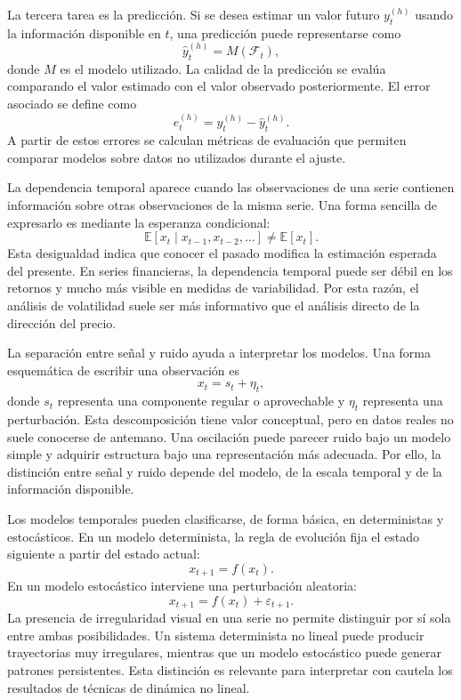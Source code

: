 La tercera tarea es la predicción. Si se desea estimar un valor futuro \(y_t^{(h)}\) usando la información disponible en \(t\), una predicción puede representarse como
\begin{equation}
    \hat{y}_t^{(h)} = M(\mathcal{F}_t),
\end{equation}
donde \(M\) es el modelo utilizado. La calidad de la predicción se evalúa comparando el valor estimado con el valor observado posteriormente. El error asociado se define como
\begin{equation}
    e_t^{(h)} = y_t^{(h)} - \hat{y}_t^{(h)}.
\end{equation}
A partir de estos errores se calculan métricas de evaluación que permiten comparar modelos sobre datos no utilizados durante el ajuste.

La dependencia temporal aparece cuando las observaciones de una serie contienen información sobre otras observaciones de la misma serie. Una forma sencilla de expresarlo es mediante la esperanza condicional:
\begin{equation}
    \mathbb{E}[x_t \mid x_{t-1}, x_{t-2}, \ldots] \neq \mathbb{E}[x_t].
\end{equation}
Esta desigualdad indica que conocer el pasado modifica la estimación esperada del presente. En series financieras, la dependencia temporal puede ser débil en los retornos y mucho más visible en medidas de variabilidad. Por esta razón, el análisis de volatilidad suele ser más informativo que el análisis directo de la dirección del precio.

La separación entre señal y ruido ayuda a interpretar los modelos. Una forma esquemática de escribir una observación es
\begin{equation}
    x_t = s_t + \eta_t,
\end{equation}
donde \(s_t\) representa una componente regular o aprovechable y \(\eta_t\) representa una perturbación. Esta descomposición tiene valor conceptual, pero en datos reales no suele conocerse de antemano. Una oscilación puede parecer ruido bajo un modelo simple y adquirir estructura bajo una representación más adecuada. Por ello, la distinción entre señal y ruido depende del modelo, de la escala temporal y de la información disponible.

Los modelos temporales pueden clasificarse, de forma básica, en deterministas y estocásticos. En un modelo determinista, la regla de evolución fija el estado siguiente a partir del estado actual:
\begin{equation}
    x_{t+1} = f(x_t).
\end{equation}
En un modelo estocástico interviene una perturbación aleatoria:
\begin{equation}
    x_{t+1} = f(x_t) + \varepsilon_{t+1}.
\end{equation}
La presencia de irregularidad visual en una serie no permite distinguir por sí sola entre ambas posibilidades. Un sistema determinista no lineal puede producir trayectorias muy irregulares, mientras que un modelo estocástico puede generar patrones persistentes. Esta distinción es relevante para interpretar con cautela los resultados de técnicas de dinámica no lineal.

